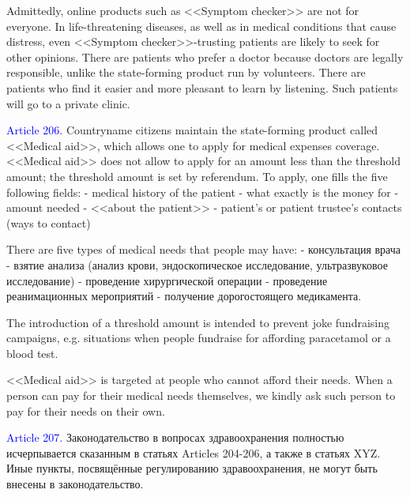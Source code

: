 \documentclass[11pt]{article}
\theoremstyle{remark}
\theoremstyle{definition}
\begin{document}
Admittedly, online products such as <<Symptom checker>> are not for everyone. In life-threatening diseases, as well as in medical conditions that cause distress, even <<Symptom checker>>-trusting patients are likely to seek for other opinions. There are patients who prefer a doctor because doctors are legally responsible, unlike the state-forming product run by volunteers. There are patients who find it easier and more pleasant to learn by listening. Such patients will go to a private clinic. 





\color{black}




\textcolor{blue}{Article 206.} Countryname citizens maintain the state-forming product called <<Medical aid>>, 
which allows one to apply for medical expenses coverage. <<Medical aid>> does not allow to apply for an amount less than the threshold amount; the threshold amount is set by referendum. To apply, one fills the five following fields:
- medical history of the patient
- what exactly is the money for
- amount needed
- <<about the patient>>
- patient's or patient trustee's contacts (ways to contact)


\color{blue}

There are five types of medical needs that people may have:
- консультация врача
- взятие анализа (анализ крови, эндоскопическое исследование, ультразвуковое исследование)
- проведение хирургической операции
- проведение реанимационных мероприятий
- получение дорогостоящего медикамента.

The introduction of a threshold amount is intended to prevent joke fundraising campaigns, e.g. situations when people fundraise for affording paracetamol or a blood test.

<<Medical aid>> is targeted at people who cannot afford their needs. When a person can pay for their medical needs themselves, we kindly ask such person to pay for their needs on their own.



\color{black}



\textcolor{blue}{Article 207.} Законодательство в вопросах здравоохранения полностью исчерпывается сказанным в статьях Articles 204-206, а также в статьях XYZ. Иные пункты, посвящённые регулированию здравоохранения, не могут быть внесены в законодательство. %
\end{document}

